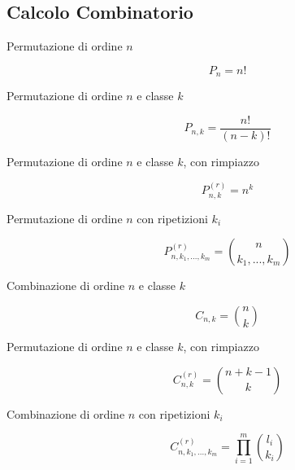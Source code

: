 \subsection{Calcolo Combinatorio}
\begin{description}
	
	\item[Permutazione di ordine $n$]
		\begin{equation}
		P_{n}=n!
		\end{equation}
	
	\item[Permutazione di ordine $n$ e classe $k$]
		\begin{equation}
		P_{n,k}=\frac{n!}{(n-k)!}
		\end{equation}
	
	\item[Permutazione di ordine $n$ e classe $k$, con rimpiazzo]
		\begin{equation}
		P_{n,k}^{(r)}=n^{k}
		\end{equation}
	
	\item[Permutazione di ordine $n$ con ripetizioni $k_{i}$]
		\begin{equation}
		P_{n,k_{1},...,k_{m}}^{(r)}=\binom{n}{k_{1},...,k_{m}}
		\end{equation}
	
	\item[Combinazione di ordine $n$ e classe $k$]
		\begin{equation}
		C_{n,k}=\binom{n}{k}
		\end{equation}
	
	\item[Permutazione di ordine $n$ e classe $k$, con rimpiazzo]
		\begin{equation}
		C_{n,k}^{(r)}=\binom{n+k-1}{k}
		\end{equation}
	
	\item[Combinazione di ordine $n$ con ripetizioni $k_{i}$]
		\begin{equation}
		C_{n,k_{1},...,k_{m}}^{(r)}=\prod_{i=1}^{m}\binom{l_{i}}{k_{i}}
		\end{equation}
	
\end{description}
\newpage

